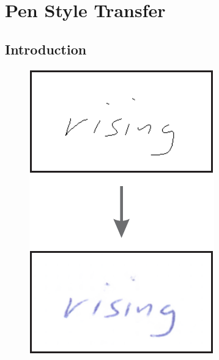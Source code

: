 \chapter{Pen Style Transfer}\label{chapter:imageStyleTransfer}

\section{Introduction}

\begin{figure}
  \vspace{-15pt}
  \raggedleft
  \begin{minipage}{0.20\textwidth}
    \centering
    \includegraphics[width=\textwidth]{../assets/showcase/pen_style_transfer.pdf}
    \caption[Pen style transfer]{}
    \vspace{-15pt}
    \label{fig:imageStyleTransfer}
  \end{minipage}%
\end{figure}

